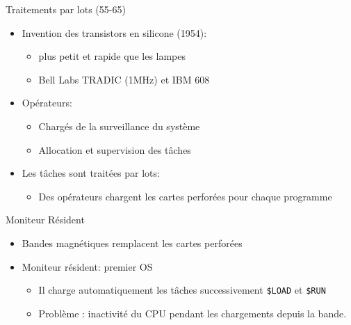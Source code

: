 \documentclass[11pt]{beamer}
\begin{document}
\begin{frame}{Traitements par lots (55-65)}
\begin{itemize}
\item
  Invention des transistors en silicone (1954):

  \begin{itemize}
  \item
    plus petit et rapide que les lampes
  \item
    Bell Labs TRADIC (1MHz) et IBM 608
  \end{itemize}
\item
  Opérateurs:

  \begin{itemize}
  \itemsep1pt\parskip0pt
  \item
    Chargés de la surveillance du système
  \item
    Allocation et supervision des tâches
  \end{itemize}
\item
  Les tâches sont traitées par lots:
  \begin{itemize}
      \item Des opérateurs chargent les cartes perforées pour chaque programme
  \end{itemize}
\end{itemize}
\end{frame}


\begin{frame}{Moniteur Résident}
  \begin{itemize}
  \itemsep1pt\parskip0pt
  \item
    Bandes magnétiques remplacent les cartes perforées
  \item
    Moniteur résident: premier OS

    \begin{itemize}
    \itemsep1pt\parskip0pt
    \item
      Il charge automatiquement les tâches successivement
      \texttt{\$LOAD} et \texttt{\$RUN}
    \item Problème : inactivité du CPU pendant les chargements depuis la bande.
    \end{itemize}
  \end{itemize}
\end{frame}
\end{document}
